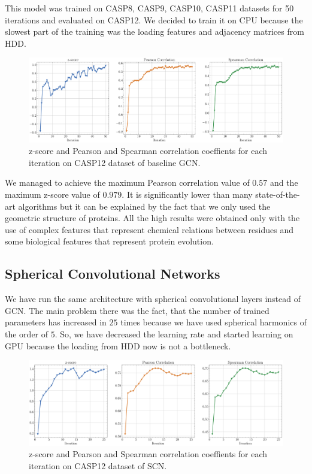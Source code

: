 \documentclass[12pt,twoside]{article}
\begin{document}
	This model was trained on CASP8, CASP9, CASP10, CASP11 datasets for 50 iterations and evaluated on CASP12. We decided to train
	it on CPU because the slowest part of the training was the loading features and adjacency matrices from HDD.
	\begin{figure}[H]
		\centering
		\includegraphics[width=1.0\textwidth]{img/z_score_casp12.pdf}
		\caption{z-score and Pearson and Spearman correlation coeffients for each iteration on CASP12 dataset of baseline 
		GCN.}
		\label{fig:mesh1}
	\end{figure}

	We managed to achieve the maximum Pearson correlation value of $0.57$ and the maximum z-score value of $0.979$. It is significantly lower
	than many state-of-the-art algorithms\cite{Baldassarre2020GRAPHQAPM} but it can be explained by the fact that we only used the geometric structure of proteins.
	All the high results were obtained only with the use of complex features that represent chemical relations between residues and some
	biological features that represent protein evolution\cite{Baldassarre2020GRAPHQAPM}.

	\subsection{Spherical Convolutional Networks}
	We have run the same architecture with spherical convolutional layers instead of GCN. The main problem there was the fact, that
	the number of trained parameters has increased in $25$ times because we have used spherical harmonics of the order of $5$. So, we
	have decreased the learning rate and started learning on GPU because the loading from HDD now is not a bottleneck.
	\begin{figure}[h]
		\centering
		\includegraphics[width=1.0\textwidth]{img/z_score_casp12_sh.pdf}
		\caption{z-score and Pearson and Spearman correlation coeffients for each iteration on CASP12 dataset of SCN.}
		\label{fig:mesh1}
	\end{figure}
\end{document}
